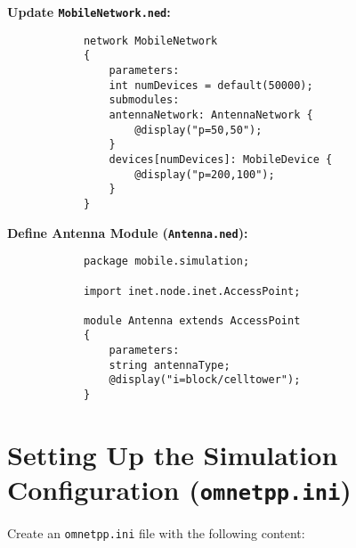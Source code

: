 \documentclass{article}
\begin{document}
		\textbf{Update \texttt{MobileNetwork.ned}:}
		
		\begin{verbatim}
			network MobileNetwork
			{
				parameters:
				int numDevices = default(50000);
				submodules:
				antennaNetwork: AntennaNetwork {
					@display("p=50,50");
				}
				devices[numDevices]: MobileDevice {
					@display("p=200,100");
				}
			}
		\end{verbatim}
		
		\textbf{Define Antenna Module (\texttt{Antenna.ned}):}
		
		\begin{verbatim}
			package mobile.simulation;
			
			import inet.node.inet.AccessPoint;
			
			module Antenna extends AccessPoint
			{
				parameters:
				string antennaType;
				@display("i=block/celltower");
			}
		\end{verbatim}
		
		\section{Setting Up the Simulation Configuration (\texttt{omnetpp.ini})}
		
		Create an \texttt{omnetpp.ini} file with the following content:
		
\end{document}
